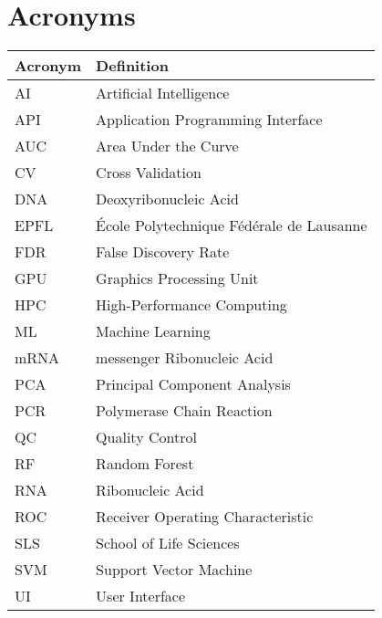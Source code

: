 \section*{Acronyms}

\begin{table}[htp!]
\centering
\label{tab:acronyms}
\begin{tabular}{ll}
\hline
\textbf{Acronym} & \textbf{Definition} \\
\hline
AI & Artificial Intelligence \\
API & Application Programming Interface \\
AUC & Area Under the Curve \\
CV & Cross Validation \\
DNA & Deoxyribonucleic Acid \\
EPFL & École Polytechnique Fédérale de Lausanne \\
FDR & False Discovery Rate \\
GPU & Graphics Processing Unit \\
HPC & High-Performance Computing \\
ML & Machine Learning \\
mRNA & messenger Ribonucleic Acid \\
PCA & Principal Component Analysis \\
PCR & Polymerase Chain Reaction \\
QC & Quality Control \\
RF & Random Forest \\
RNA & Ribonucleic Acid \\
ROC & Receiver Operating Characteristic \\
SLS & School of Life Sciences \\
SVM & Support Vector Machine \\
UI & User Interface \\
\hline
\end{tabular}
\end{table}
